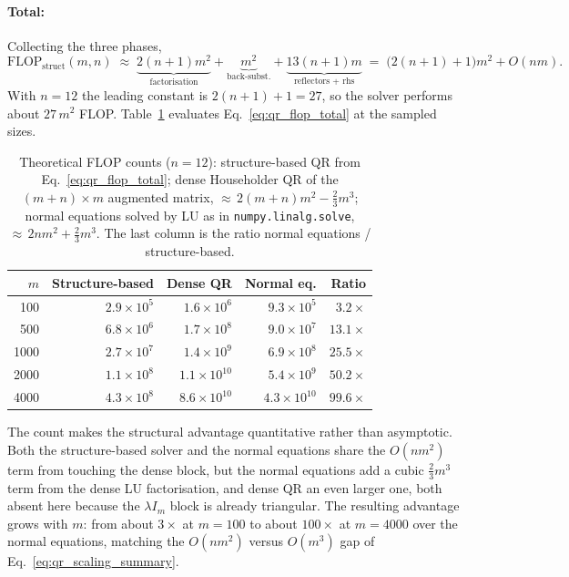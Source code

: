 \paragraph{Total:} Collecting the three phases,
\begin{equation}
\label{eq:qr_flop_total}
  \text{FLOP}_{\text{struct}}(m,n)
  \;\approx\; \underbrace{2(n+1)m^2}_{\text{factorisation}}
           + \underbrace{m^2}_{\text{back-subst.}}
           + \underbrace{13(n+1)m}_{\text{reflectors + rhs}}
  \;=\; \bigl(2(n+1)+1\bigr)m^2 + O(nm).
\end{equation}
With $n=12$ the leading constant is $2(n+1)+1 = 27$, so the solver performs
about $27\,m^2$ FLOP. Table~\ref{tab:qr_flop_count} evaluates
Eq.~\eqref{eq:qr_flop_total} at the sampled sizes.

\begin{table}[H]
\centering
\caption{Theoretical FLOP counts ($n = 12$): structure-based QR from
  Eq.~\eqref{eq:qr_flop_total}; dense Householder QR of the $(m+n)\times m$
  augmented matrix, ${\approx}\,2(m+n)m^2-\tfrac23 m^3$; normal equations
  solved by LU as in \texttt{numpy.linalg.solve}, ${\approx}\,2nm^2+\tfrac23 m^3$.
  The last column is the ratio normal equations / structure-based.}
\label{tab:qr_flop_count}
\small
\setlength{\tabcolsep}{8pt}
\begin{tabular}{rrrrr}
    \toprule
    $m$ & \textbf{Structure-based} & \textbf{Dense QR} & \textbf{Normal eq.}
        & \textbf{Ratio} \\
    \midrule
     100 & $2.9 \times 10^{5}$ & $1.6 \times 10^{6}$  & $9.3 \times 10^{5}$  & $3.2\times$ \\
     500 & $6.8 \times 10^{6}$ & $1.7 \times 10^{8}$  & $9.0 \times 10^{7}$  & $13.1\times$ \\
    1000 & $2.7 \times 10^{7}$ & $1.4 \times 10^{9}$  & $6.9 \times 10^{8}$  & $25.5\times$ \\
    2000 & $1.1 \times 10^{8}$ & $1.1 \times 10^{10}$ & $5.4 \times 10^{9}$  & $50.2\times$ \\
    4000 & $4.3 \times 10^{8}$ & $8.6 \times 10^{10}$ & $4.3 \times 10^{10}$ & $99.6\times$ \\
    \bottomrule
\end{tabular}
\end{table}

\noindent The count makes the structural advantage quantitative rather than
asymptotic. Both the structure-based solver and the normal equations share
the $O(nm^2)$ term from touching the dense block, but the normal equations
add a cubic $\tfrac23 m^3$ term from the dense LU factorisation, and dense QR
an even larger one, both absent here because the $\lambda I_m$ block is
already triangular. The resulting advantage grows with $m$: from about
$3\times$ at $m=100$ to about $100\times$ at $m=4000$ over the normal
equations, matching the $O(nm^2)$ versus $O(m^3)$ gap of
Eq.~\eqref{eq:qr_scaling_summary}.

